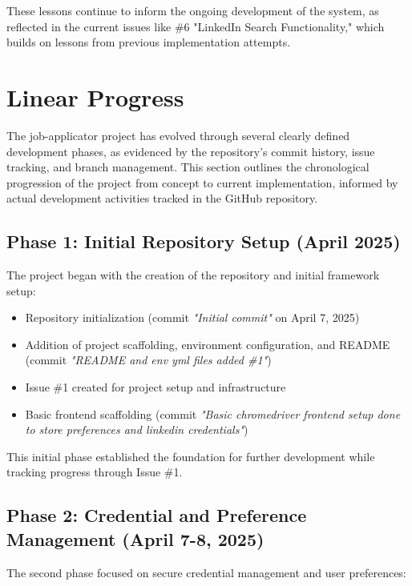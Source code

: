 \documentclass[a4paper,12pt]{article}
\begin{document}
These lessons continue to inform the ongoing development of the system, as reflected in the current issues like \#6 "LinkedIn Search Functionality," which builds on lessons from previous implementation attempts.

\newpage


\section{Linear Progress}

The job-applicator project has evolved through several clearly defined development phases, as evidenced by the repository's commit history, issue tracking, and branch management. This section outlines the chronological progression of the project from concept to current implementation, informed by actual development activities tracked in the GitHub repository.

\subsection{Phase 1: Initial Repository Setup (April 2025)}

The project began with the creation of the repository and initial framework setup:

\begin{itemize}
    \item Repository initialization (commit \textit{"Initial commit"} on April 7, 2025)
    \item Addition of project scaffolding, environment configuration, and README (commit \textit{"README and env yml files added \#1"})
    \item Issue \#1 created for project setup and infrastructure
    \item Basic frontend scaffolding (commit \textit{"Basic chromedriver frontend setup done to store preferences and linkedin credentials"})
\end{itemize}

This initial phase established the foundation for further development while tracking progress through Issue \#1.

\subsection{Phase 2: Credential and Preference Management (April 7-8, 2025)}

The second phase focused on secure credential management and user preferences:
\end{document}
